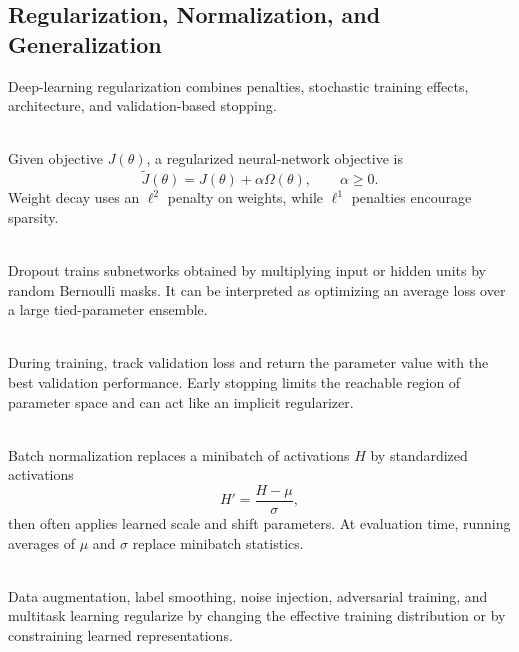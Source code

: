 \subsection{Regularization, Normalization, and Generalization}

Deep-learning regularization combines penalties, stochastic training effects, architecture, and validation-based stopping.

\begin{definition} \label{def:sl-neural-regularized-objective} \\
Given objective $J(\theta)$, a regularized neural-network objective is
\[
\widetilde{J}(\theta)=J(\theta)+\alpha\Omega(\theta),
\qquad
\alpha\geq0.
\]
Weight decay uses an $\ell^2$ penalty on weights, while $\ell^1$ penalties encourage sparsity.
\end{definition}

\begin{definition} \label{def:sl-dropout} \\
Dropout trains subnetworks obtained by multiplying input or hidden units by random Bernoulli masks.  It can be interpreted as optimizing an average loss over a large tied-parameter ensemble.
\end{definition}

\begin{method} \label{method:sl-early-stopping} \\
During training, track validation loss and return the parameter value with the best validation performance.  Early stopping limits the reachable region of parameter space and can act like an implicit regularizer.
\end{method}

\begin{definition} \label{def:sl-batch-normalization} \\
Batch normalization replaces a minibatch of activations $H$ by standardized activations
\[
H'=\frac{H-\mu}{\sigma},
\]
then often applies learned scale and shift parameters.  At evaluation time, running averages of $\mu$ and $\sigma$ replace minibatch statistics.
\end{definition}

\begin{remark} \label{rem:sl-data-augmentation-noise} \\
Data augmentation, label smoothing, noise injection, adversarial training, and multitask learning regularize by changing the effective training distribution or by constraining learned representations.
\end{remark}
